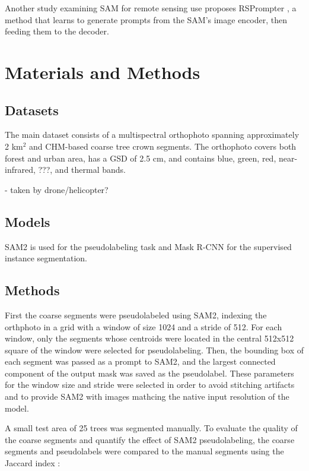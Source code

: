 \documentclass[english, 12pt, a4paper, sci, utf8, a-2b, online]{aaltothesis}
\begin{document}
Another study examining SAM for remote sensing use proposes RSPrompter \cite{rsprompter}, a method that learns to generate prompts from the SAM's image encoder, then feeding them to the decoder.

\newpage
\section{Materials and Methods}

\subsection{Datasets}

The main dataset consists of a multispectral orthophoto spanning approximately 2 km$^2$ and CHM-based coarse tree crown segments. The orthophoto covers both forest and urban area, has a GSD of 2.5 cm, and contains blue, green, red, near-infrared, ???, and thermal bands.

- taken by drone/helicopter?

\subsection{Models}

SAM2 is used for the pseudolabeling task and Mask R-CNN \cite{maskrcnn} for the supervised instance segmentation.

\subsection{Methods}

First the coarse segments were pseudolabeled using SAM2, indexing the orthphoto in a grid with a window of size 1024 and a stride of 512. For each window, only the segments whose centroids were located in the central 512x512 square of the window were selected for pseudolabeling. Then, the bounding box of each segment was passed as a prompt to SAM2, and the largest connected component of the output mask was saved as the pseudolabel. These parameters for the window size and stride were selected in order to avoid stitching artifacts and to provide SAM2 with images mathcing the native input resolution of the model.

A small test area of 25 trees was segmented manually. To evaluate the quality of the coarse segments and quantify the effect of SAM2 pseudolabeling, the coarse segments and pseudolabels were compared to the manual segments using the Jaccard index \cite{jaccard}:
\end{document}
